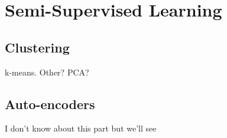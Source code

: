 \section{Semi-Supervised Learning}
\label{sec:semisupervised}

\subsection{Clustering}

k-means. Other? PCA?

\subsection{Auto-encoders}

I don't know about this part but we'll see